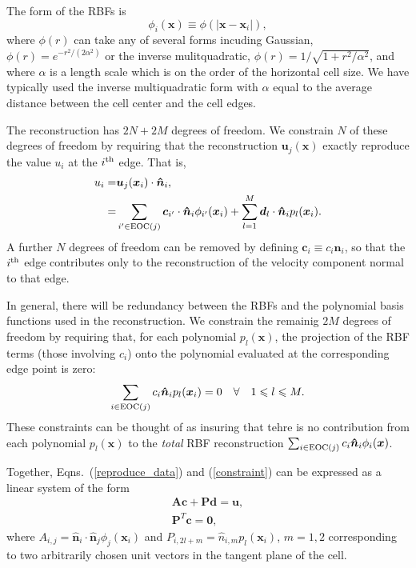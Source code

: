 \documentclass[onecolumn, referee]{svjour3}                     %
\begin{document}
The form of the RBFs is
\begin{equation}\label{problem}
  \phi_i(\bm{x}) \equiv \phi(\left|\bm{x}-\bm{x}_i\right|),
\end{equation}
where $\phi(r)$ can take any of several forms incuding Gaussian, $\phi(r) = e^{-r^2/(2 \alpha^2)}$ or the inverse mulitquadratic, $\phi(r) = 1/\sqrt{1 + r^2/\alpha^2}$, and where $\alpha$ is a length scale which is on the order of the horizontal cell size.  We have typically used the inverse multiquadratic form with $\alpha$ equal to the average distance between the cell center and the cell edges.

The reconstruction has $2 N + 2 M$ degrees of freedom.  We constrain $N$ of these degrees of freedom by requiring that the reconstruction $\bm{u}_j(\bm{x})$ exactly reproduce the value $u_i$ at the $i^{\rm th}$ edge.  That is,
\begin{align}\label{reproduce_data}
  u_i = & \bm{u}_j(\bm{x}_i) \cdot  \bm{\hat{n}}_i, \nonumber \\
    = & \sum_{i' \in {\rm EOC}(j)} \bm{c}_{i'}\cdot  \bm{\hat{n}}_i \phi_{i'}(\bm{x}_i) + \sum_{l=1}^M \bm{d}_l \cdot  \bm{\hat{n}}_i p_l(\bm{x}_i).
\end{align}
A further $N$ degrees of freedom can be removed by defining $\bm{c}_{i} \equiv c_i \bm{\hat{n}}_i$, so that the $i^{\rm th}$ edge contributes only to the reconstruction of the velocity component normal to that edge.

In general, there will be redundancy between the RBFs and the polynomial basis functions used in the reconstruction.  We constrain the remainig $2 M$ degrees of freedom by requiring that, for each polynomial $p_l(\bm{x})$, the projection of the RBF terms (those involving $c_i$) onto the polynomial evaluated at the corresponding edge point is zero:
\begin{equation}\label{constraint}
  \sum_{i \in {\rm EOC}(j)} c_i \bm{\hat{n}}_i p_l(\bm{x}_i) = 0 \quad  \forall \quad 1 \leqslant l \leqslant M.
\end{equation}
These constraints can be thought of as insuring that tehre is no contribution from each polynomial $p_l(\bm{x})$ to the {\it total} RBF reconstruction $\sum_{i \in {\rm EOC}(j)} c_i \bm{\hat{n}}_i \phi_i(\bm{x})$.

Together, Eqns.~(\ref{reproduce_data}) and (\ref{constraint}) can be expressed as a linear system of the form
\begin{align}\label{linear_system}
  \bm{A} \bm{c} + \bm{P} \bm{d}  = \bm{u}, \\
  \bm{P}^T \bm{c} = \bm{0},
\end{align}
where $A_{i,j} = \bm{\hat{n}}_i \cdot \bm{\hat{n}}_j \phi_{j}(\bm{x}_i)$ and $P_{i,2 l+m} = \hat{n}_{i,m}  p_l(\bm{x}_i)$, $m = 1,2$ corresponding to two arbitrarily chosen unit vectors in the tangent plane of the cell.
\end{document}
